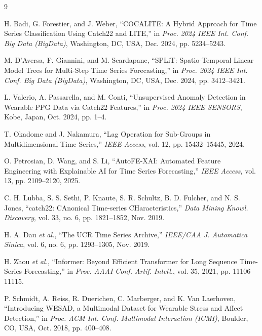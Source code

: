 \documentclass[10pt,conference]{IEEEtran}
\begin{document}
\begin{thebibliography}{9}

H. Badi, G. Forestier, and J. Weber, ``COCALITE: A Hybrid Approach for Time Series Classification Using Catch22 and LITE,'' in \textit{Proc. 2024 IEEE Int. Conf. Big Data (BigData)}, Washington, DC, USA, Dec. 2024, pp. 5234--5243.

M. D'Aversa, F. Giannini, and M. Scardapane, ``SPLiT: Spatio-Temporal Linear Model Trees for Multi-Step Time Series Forecasting,'' in \textit{Proc. 2024 IEEE Int. Conf. Big Data (BigData)}, Washington, DC, USA, Dec. 2024, pp. 3412--3421.

L. Valerio, A. Passarella, and M. Conti, ``Unsupervised Anomaly Detection in Wearable PPG Data via Catch22 Features,'' in \textit{Proc. 2024 IEEE SENSORS}, Kobe, Japan, Oct. 2024, pp. 1--4.

T. Okadome and J. Nakamura, ``Lag Operation for Sub-Groups in Multidimensional Time Series,'' \textit{IEEE Access}, vol. 12, pp. 15432--15445, 2024.

O. Petrosian, D. Wang, and S. Li, ``AutoFE-XAI: Automated Feature Engineering with Explainable AI for Time Series Forecasting,'' \textit{IEEE Access}, vol. 13, pp. 2109--2120, 2025.

C. H. Lubba, S. S. Sethi, P. Knaute, S. R. Schultz, B. D. Fulcher, and N. S. Jones, ``catch22: CAnonical Time-series CHaracteristics,'' \textit{Data Mining Knowl. Discovery}, vol. 33, no. 6, pp. 1821--1852, Nov. 2019.

H. A. Dau \textit{et al.}, ``The UCR Time Series Archive,'' \textit{IEEE/CAA J. Automatica Sinica}, vol. 6, no. 6, pp. 1293--1305, Nov. 2019.

H. Zhou \textit{et al.}, ``Informer: Beyond Efficient Transformer for Long Sequence Time-Series Forecasting,'' in \textit{Proc. AAAI Conf. Artif. Intell.}, vol. 35, 2021, pp. 11106--11115.

P. Schmidt, A. Reiss, R. Duerichen, C. Marberger, and K. Van Laerhoven, ``Introducing WESAD, a Multimodal Dataset for Wearable Stress and Affect Detection,'' in \textit{Proc. ACM Int. Conf. Multimodal Interaction (ICMI)}, Boulder, CO, USA, Oct. 2018, pp. 400--408.

\end{thebibliography}
\end{document}
